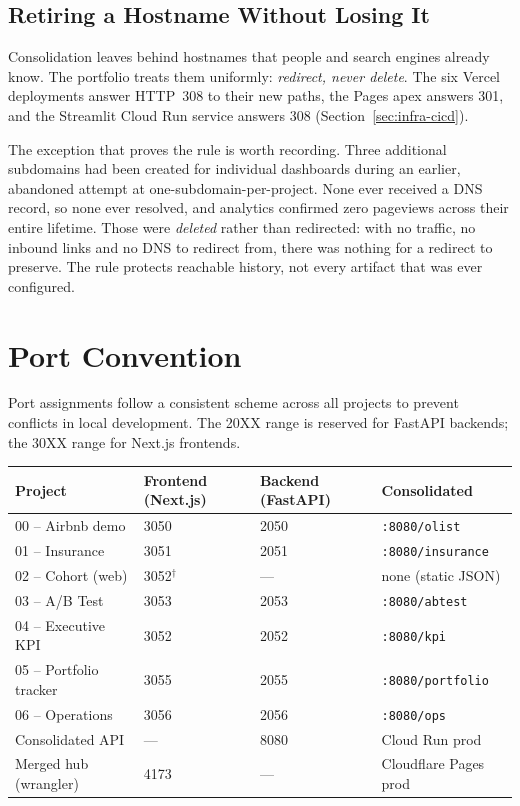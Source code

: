 \subsection{Retiring a Hostname Without Losing It}

Consolidation leaves behind hostnames that people and search engines already
know. The portfolio treats them uniformly: \emph{redirect, never delete}. The six
Vercel deployments answer HTTP~308 to their new paths, the Pages apex answers
301, and the Streamlit Cloud Run service answers 308 (Section~\ref{sec:infra-cicd}).

The exception that proves the rule is worth recording. Three additional
subdomains had been created for individual dashboards during an earlier,
abandoned attempt at one-subdomain-per-project. None ever received a DNS record,
so none ever resolved, and analytics confirmed zero pageviews across their entire
lifetime. Those were \emph{deleted} rather than redirected: with no traffic, no
inbound links and no DNS to redirect from, there was nothing for a redirect to
preserve. The rule protects reachable history, not every artifact that was ever
configured.

\section{Port Convention}
\label{sec:infra-ports}

Port assignments follow a consistent scheme across all projects to prevent conflicts in local development. The 20XX range is reserved for FastAPI backends; the 30XX range for Next.js frontends.

\begin{center}
\begin{tabular}{llll}
\toprule
\textbf{Project} & \textbf{Frontend (Next.js)} & \textbf{Backend (FastAPI)} & \textbf{Consolidated} \\
\midrule
00 -- Airbnb demo & 3050 & 2050 & \texttt{:8080/olist} \\
01 -- Insurance & 3051 & 2051 & \texttt{:8080/insurance} \\
02 -- Cohort (web) & 3052$^\dagger$ & --- & none (static JSON) \\
03 -- A/B Test & 3053 & 2053 & \texttt{:8080/abtest} \\
04 -- Executive KPI & 3052 & 2052 & \texttt{:8080/kpi} \\
05 -- Portfolio tracker & 3055 & 2055 & \texttt{:8080/portfolio} \\
06 -- Operations & 3056 & 2056 & \texttt{:8080/ops} \\
Consolidated API & --- & 8080 & Cloud Run prod \\
Merged hub (wrangler) & 4173 & --- & Cloudflare Pages prod \\
\bottomrule
\end{tabular}
\end{center}

